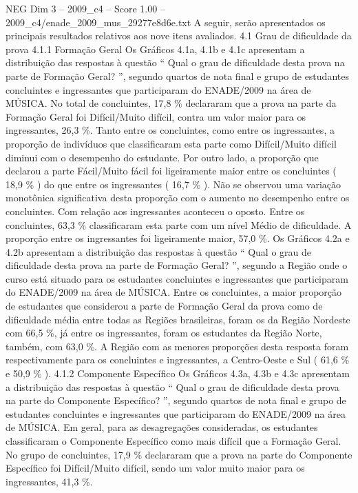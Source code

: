 \begin{textsample}{NEG Dim 3 – 2009\_c4 – Score 1.00 – 2009\_c4/enade\_2009\_mus\_29277e8d6e.txt}
A seguir, serão apresentados os principais resultados relativos aos nove itens avaliados. 4.1 Grau de dificuldade da prova 4.1.1 Formação Geral Os Gráficos 4.1a, 4.1b e 4.1c apresentam a distribuição das respostas à questão “ Qual o grau de dificuldade desta prova na parte de Formação Geral? ”, segundo quartos de nota final e grupo de estudantes concluintes e ingressantes que participaram do ENADE/2009 na área de MÚSICA.
No total de concluintes, 17,8 \% declararam que a prova na parte da Formação Geral foi Difícil/Muito difícil, contra um valor maior para os ingressantes, 26,3 \%.
Tanto entre os concluintes, como entre os ingressantes, a proporção de indivíduos que classificaram esta parte como Difícil/Muito difícil diminui com o desempenho do estudante.
Por outro lado, a proporção que declarou a parte Fácil/Muito fácil foi ligeiramente maior entre os concluintes ( 18,9 \% ) do que entre os ingressantes ( 16,7 \% ).
Não se observou uma variação monotônica significativa desta proporção com o aumento no desempenho entre os concluintes.
Com relação aos ingressantes aconteceu o oposto.
Entre os concluintes, 63,3 \% classificaram esta parte com um nível Médio de dificuldade.
A proporção entre os ingressantes foi ligeiramente maior, 57,0 \%.
Os Gráficos 4.2a e 4.2b apresentam a distribuição das respostas à questão “ Qual o grau de dificuldade desta prova na parte de Formação Geral? ”, segundo a Região onde o curso está situado para os estudantes concluintes e ingressantes que participaram do ENADE/2009 na área de MÚSICA.
Entre os concluintes, a maior proporção de estudantes que considerou a parte de Formação Geral da prova como de dificuldade média entre todas as Regiões brasileiras, foram os da Região Nordeste com 66,5 \%, já entre os ingressantes, foram os estudantes da Região Norte, também, com 63,0 \%.
A Região com as menores proporções desta resposta foram respectivamente para os concluintes e ingressantes, a Centro-Oeste e Sul ( 61,6 \% e 50,9 \% ). 4.1.2 Componente Específico Os Gráficos 4.3a, 4.3b e 4.3c apresentam a distribuição das respostas à questão “ Qual o grau de dificuldade desta prova na parte do Componente Específico? ”, segundo quartos de nota final e grupo de estudantes concluintes e ingressantes que participaram do ENADE/2009 na área de MÚSICA.
Em geral, para as desagregações consideradas, os estudantes classificaram o Componente Específico como mais difícil que a Formação Geral.
No grupo de concluintes, 17,9 \% declararam que a prova na parte do Componente Específico foi Difícil/Muito difícil, sendo um valor muito maior para os ingressantes, 41,3 \%.

\end{textsample}
